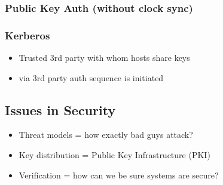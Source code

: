 \documentclass[11pt]{article}
\begin{document}
\subsubsection{Public Key Auth (without clock sync)}
\label{sec:orgheadline163}
\subsubsection{Kerberos}
\label{sec:orgheadline164}
\begin{itemize}
\item Trusted 3rd party with whom hosts share keys
\item via 3rd party auth sequence is initiated
\end{itemize}

\subsection{Issues in Security}
\label{sec:orgheadline166}
\begin{itemize}
\item Threat models = how exactly bad guys attack?
\item Key distribution = Public Key Infrastructure (PKI)
\item Verification = how can we be sure systems are secure?
\end{itemize}
\end{document}
